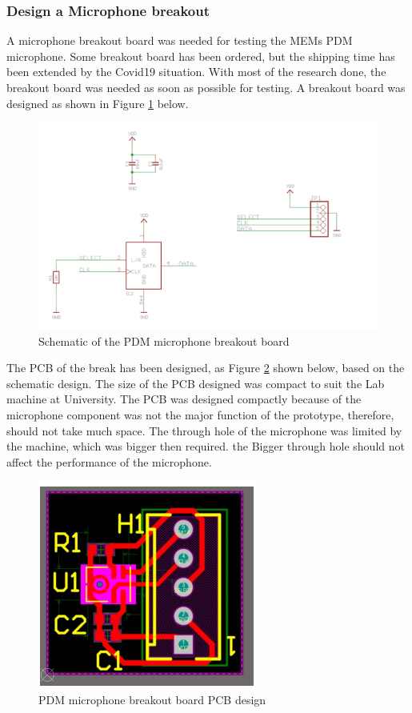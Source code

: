 \subsubsection{Design a Microphone breakout}
A microphone breakout board was needed for testing the MEMs PDM microphone. Some breakout board has been ordered, but the shipping time has been extended by the Covid19 situation. With most of the research done, the breakout board was needed as soon as possible for testing. A breakout board was designed as shown in Figure \ref{fig:PDMsche} below. 
\begin{figure}[H]
	\centering
	\noindent\includegraphics[width=1\textwidth]{images/PDMschematic.png}
	\caption{Schematic of the PDM microphone breakout board}
	\label{fig:PDMsche}
\end{figure}
The PCB of the break has been designed, as Figure \ref{fig:PDMbreakout} shown below, based on the schematic design. The size of the PCB designed was compact to suit the Lab machine at University. The PCB was designed compactly because of the microphone component was not the major function of the prototype, therefore, should not take much space. The through hole of the microphone was limited by the machine, which was bigger then required. the Bigger through hole should not affect the performance of the microphone. 
\begin{figure}[H]
	\centering
	\noindent\includegraphics[width=.25\textwidth]{images/PDMbreakout.png}
	\caption{PDM microphone breakout board PCB design}
	\label{fig:PDMbreakout}
\end{figure}

